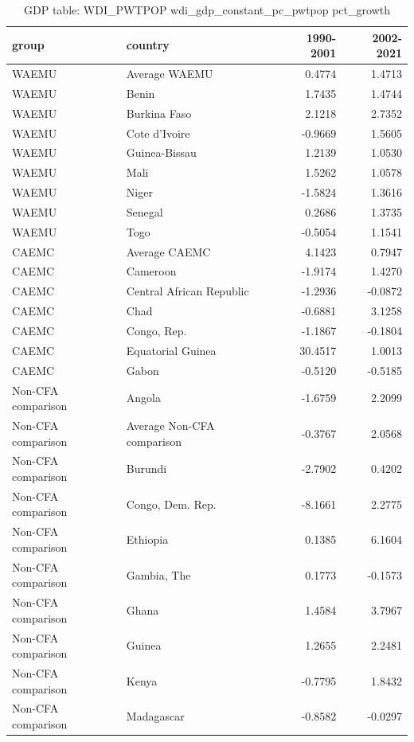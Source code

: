 \begin{table}

\caption{GDP table: WDI_PWTPOP wdi_gdp_constant_pc_pwtpop pct_growth}
\centering
\begin{tabular}[t]{llrr}
\toprule
group & country & 1990-2001 & 2002-2021\\
\midrule
WAEMU & Average WAEMU & 0.4774 & 1.4713\\
WAEMU & Benin & 1.7435 & 1.4744\\
WAEMU & Burkina Faso & 2.1218 & 2.7352\\
WAEMU & Cote d'Ivoire & -0.9669 & 1.5605\\
WAEMU & Guinea-Bissau & 1.2139 & 1.0530\\
\addlinespace
WAEMU & Mali & 1.5262 & 1.0578\\
WAEMU & Niger & -1.5824 & 1.3616\\
WAEMU & Senegal & 0.2686 & 1.3735\\
WAEMU & Togo & -0.5054 & 1.1541\\
CAEMC & Average CAEMC & 4.1423 & 0.7947\\
\addlinespace
CAEMC & Cameroon & -1.9174 & 1.4270\\
CAEMC & Central African Republic & -1.2936 & -0.0872\\
CAEMC & Chad & -0.6881 & 3.1258\\
CAEMC & Congo, Rep. & -1.1867 & -0.1804\\
CAEMC & Equatorial Guinea & 30.4517 & 1.0013\\
\addlinespace
CAEMC & Gabon & -0.5120 & -0.5185\\
Non-CFA comparison & Angola & -1.6759 & 2.2099\\
Non-CFA comparison & Average Non-CFA comparison & -0.3767 & 2.0568\\
Non-CFA comparison & Burundi & -2.7902 & 0.4202\\
Non-CFA comparison & Congo, Dem. Rep. & -8.1661 & 2.2775\\
\addlinespace
Non-CFA comparison & Ethiopia & 0.1385 & 6.1604\\
Non-CFA comparison & Gambia, The & 0.1773 & -0.1573\\
Non-CFA comparison & Ghana & 1.4584 & 3.7967\\
Non-CFA comparison & Guinea & 1.2655 & 2.2481\\
Non-CFA comparison & Kenya & -0.7795 & 1.8432\\
\addlinespace
Non-CFA comparison & Madagascar & -0.8582 & -0.0297\\

\end{tabular}
\end{table}
